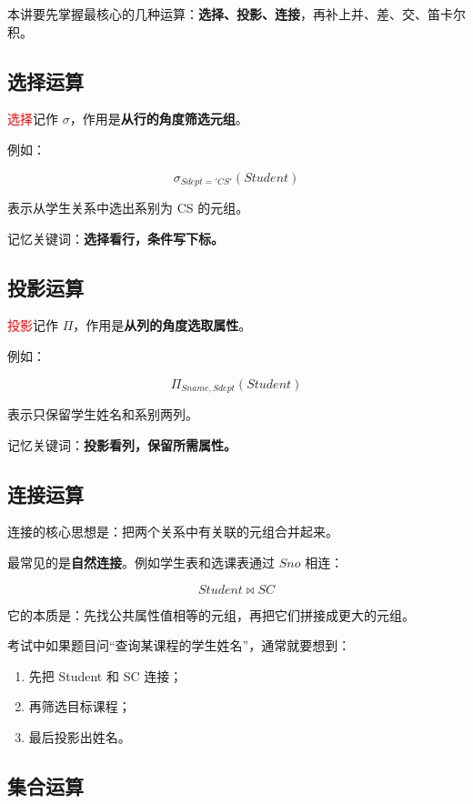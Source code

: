 \documentclass{../../note}
\begin{document}
本讲要先掌握最核心的几种运算：\textbf{选择、投影、连接}，再补上并、差、交、笛卡尔积。

\subsection{选择运算}

\textcolor{red}{选择}记作 $\sigma$，作用是\textbf{从行的角度筛选元组}。

例如：

\[
\sigma_{Sdept='CS'}(Student)
\]

表示从学生关系中选出系别为 CS 的元组。

记忆关键词：\textbf{选择看行，条件写下标。}

\subsection{投影运算}

\textcolor{red}{投影}记作 $\Pi$，作用是\textbf{从列的角度选取属性}。

例如：

\[
\Pi_{Sname,Sdept}(Student)
\]

表示只保留学生姓名和系别两列。

记忆关键词：\textbf{投影看列，保留所需属性。}

\subsection{连接运算}

连接的核心思想是：把两个关系中有关联的元组合并起来。

最常见的是\textbf{自然连接}。例如学生表和选课表通过 $Sno$ 相连：

\[
Student \bowtie SC
\]

它的本质是：先找公共属性值相等的元组，再把它们拼接成更大的元组。

考试中如果题目问“查询某课程的学生姓名”，通常就要想到：

\begin{enumerate}
  \item 先把 Student 和 SC 连接；
  \item 再筛选目标课程；
  \item 最后投影出姓名。
\end{enumerate}

\subsection{集合运算}
\end{document}
